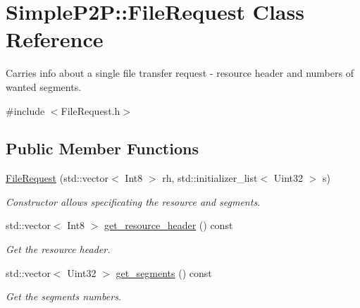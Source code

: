 \hypertarget{classSimpleP2P_1_1FileRequest}{}\section{Simple\+P2P\+:\+:File\+Request Class Reference}
\label{classSimpleP2P_1_1FileRequest}


Carries info about a single file transfer request -\/ resource header and numbers of wanted segments.  




{\ttfamily \#include $<$File\+Request.\+h$>$}

\subsection*{Public Member Functions}
\begin{DoxyCompactItemize}
\item 
\hyperlink{classSimpleP2P_1_1FileRequest_a6e50d4f7d07a46ddcd72745ebc6e9e81}{File\+Request} (std\+::vector$<$ Int8 $>$ rh, std\+::initializer\+\_\+list$<$ Uint32 $>$ s)
\begin{DoxyCompactList}\small\item\em Constructor allows specificating the resource and segments. \end{DoxyCompactList}\item 
\mbox{\label{classSimpleP2P_1_1FileRequest_a611bde99dbd62e155853e127fa102910}} 
std\+::vector$<$ Int8 $>$ \hyperlink{classSimpleP2P_1_1FileRequest_a611bde99dbd62e155853e127fa102910}{get\+\_\+resource\+\_\+header} () const
\begin{DoxyCompactList}\small\item\em Get the resource header. \end{DoxyCompactList}\item 
\mbox{\label{classSimpleP2P_1_1FileRequest_ad3b33994ea628979673195fd4e3348af}} 
std\+::vector$<$ Uint32 $>$ \hyperlink{classSimpleP2P_1_1FileRequest_ad3b33994ea628979673195fd4e3348af}{get\+\_\+segments} () const
\begin{DoxyCompactList}\small\item\em Get the segments\textquotesingle{} numbers. \end{DoxyCompactList}\end{DoxyCompactItemize}


